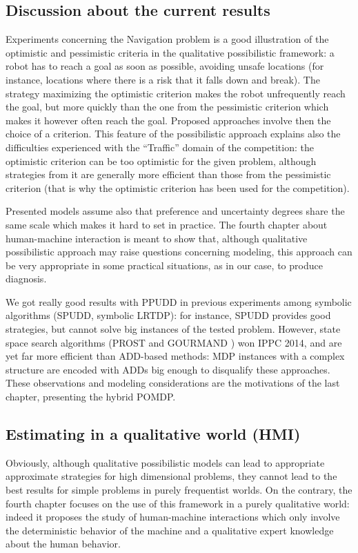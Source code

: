 \subsection*{Discussion about the current results}
Experiments concerning the Navigation problem
is a good illustration of the optimistic and pessimistic criteria
in the qualitative possibilistic framework: 
a robot has to reach a goal as soon as possible,
avoiding unsafe locations 
(for instance, locations where there is a risk that it falls down and break).
The strategy maximizing 
the optimistic criterion 
makes the robot 
unfrequently reach the goal,
but more quickly
than the one from the pessimistic criterion
which makes it however often reach the goal.  
Proposed approaches involve then 
the choice of a criterion.
This feature of the possibilistic approach
explains also the difficulties experienced
with the ``Traffic'' domain
of the competition: 
the optimistic criterion can be too optimistic
for the given problem, 
although strategies from it are generally 
more efficient than those from the pessimistic criterion
(that is why the optimistic criterion has been used for the competition).

Presented models 
assume also that preference
and uncertainty degrees
share the same scale
which makes it hard to
set in practice.
The fourth chapter about human-machine interaction
is meant to show that,
although qualitative possibilistic approach
may raise questions concerning modeling,
this approach can be very appropriate
in some practical situations,
as in our case, to produce diagnosis.

We got really good results 
with PPUDD in previous experiments 
among symbolic algorithms (SPUDD, symbolic LRTDP):
for instance, SPUDD provides good strategies, but 
cannot solve big instances of the tested problem. 
However, state space search algorithms
(PROST \cite{DBLP:conf/aips/KellerE12} and GOURMAND \cite{DBLP:conf/aaai/KolobovMW12}) won IPPC 2014,
and are yet far more efficient than ADD-based methods:
MDP instances with a complex structure
are encoded with ADDs big enough
to disqualify these approaches.
These observations and modeling considerations
are the motivations of the last chapter,
presenting the hybrid POMDP.


\subsection*{Estimating in a qualitative world (HMI)}
Obviously, although 
qualitative possibilistic models 
can lead to appropriate approximate strategies 
for high dimensional problems, 
they cannot lead to the best results
for simple problems
in purely frequentist worlds.
On the contrary, 
the fourth chapter focuses on
the use of this framework
in a purely qualitative world:
indeed it proposes the study of
human-machine interactions
which only involve the deterministic 
behavior of the machine
and a qualitative expert knowledge
about the human behavior. 

